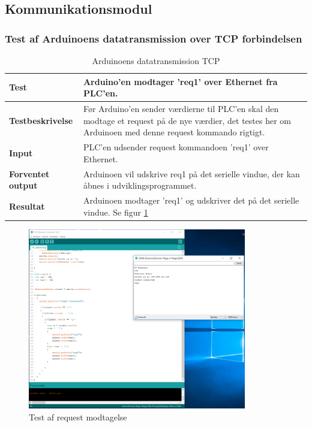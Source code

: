 \subsection{Kommunikationsmodul}

\subsubsection{Test af Arduinoens datatransmission over TCP forbindelsen}
\begin{table}
	\centering
	\begin{tabular}{ | m{} | m{}|} 
		\hline
		\textbf{Test}					&Arduino'en modtager 'req1' over Ethernet fra PLC'en.  \\ \hline
		\textbf{Testbeskrivelse}		&Før Arduino'en sender værdierne til PLC'en skal den modtage et request på de nye værdier, det testes her om Arduinoen med denne request kommando rigtigt.  \\ \hline
		\textbf{Input}					& PLC'en udsender request kommandoen 'req1' over Ethernet.\\ \hline
		\textbf{Forventet output}		&Arduinoen vil udskrive req1 på det serielle vindue, der kan åbnes i udviklingsprogrammet. \\ \hline
		\textbf{Resultat}				&Arduinoen modtager 'req1' og udskriver det på det serielle vindue. Se figur  \ref{fig:RequestModtagelse} \\ \hline
	\end{tabular}
	\caption{Arduinoens datatransmission TCP} 
	\label{tab:ArduinoTCP}
\end{table}

\begin{figure}[H] %
	\centering
	\includegraphics[width=0.85\textwidth]{Test/ModultestStyringsenhed/EthernettestArduinoTerminal}
	\caption{Test af request modtagelse}
	\label{fig:RequestModtagelse}
\end{figure}

